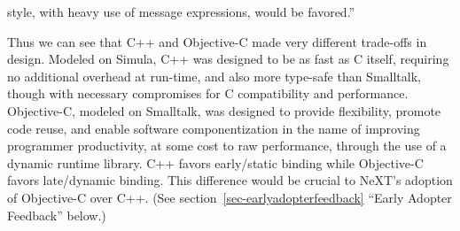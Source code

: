 \documentclass[acmsmall,screen]{acmart}
\begin{document}
style, with heavy use of message expressions, would be favored.'' \citep[60]{cox_message/object_1984}

Thus we can see that C++ and Objective-C made very different trade-offs in design. Modeled on Simula, C++ was designed to be as fast as C itself, requiring no additional overhead at run-time, and also more type-safe than Smalltalk, though with necessary compromises for C compatibility and performance. Objective-C, modeled on Smalltalk, was designed to provide flexibility, promote code reuse, and enable software componentization in the name of improving programmer productivity, at some cost to raw performance, through the use of a dynamic runtime library. C++ favors early/static binding while Objective-C favors late/dynamic binding. This difference would be crucial to NeXT's adoption of Objective-C over C++. (See section~\ref{sec-earlyadopterfeedback} ``Early Adopter Feedback'' below.)
\end{document}
